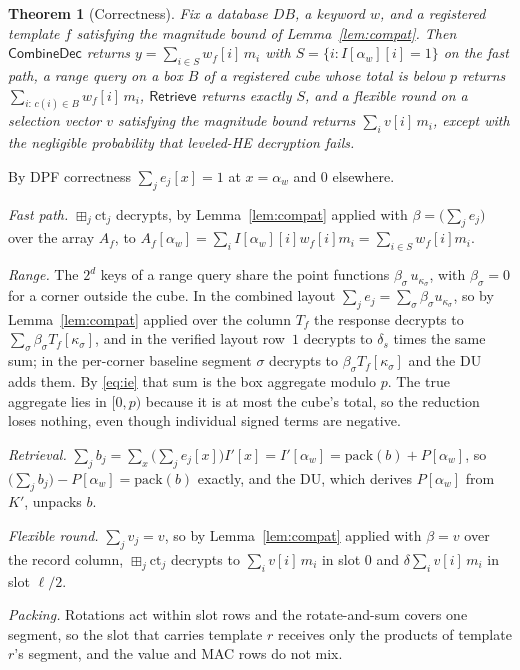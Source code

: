\documentclass[a4paper,fleqn]{cas-sc}
\newtheorem{theorem}{Theorem}
\newcommand{\bplus}{\boxplus}
\begin{document}
\begin{theorem}[Correctness]
\label{thm:correct}
Fix a database $DB$, a keyword $w$, and a registered template $f$ satisfying
the magnitude bound of Lemma~\ref{lem:compat}. Then $\mathsf{CombineDec}$
returns $y=\sum_{i\in S} w_f[i]\,m_i$ with $S=\{i: I[\alpha_w][i]=1\}$ on the
fast path, a range query on a box $B$ of a registered cube whose total is
below $p$ returns $\sum_{i:\,c(i)\in B}w_f[i]\,m_i$, $\mathsf{Retrieve}$
returns exactly $S$, and a flexible round on a selection vector $v$ satisfying
the magnitude bound returns $\sum_i v[i]\,m_i$, except with the negligible
probability that leveled-HE decryption fails.
\end{theorem}
\begin{pf}
By DPF correctness $\sum_j e_j[x]=1$ at $x=\alpha_w$ and $0$ elsewhere.

\emph{Fast path.} $\bplus_j\text{ct}_j$ decrypts, by Lemma~\ref{lem:compat}
applied with $\beta=\big(\sum_j e_j\big)$ over the array $A_f$, to
$A_f[\alpha_w]=\sum_i I[\alpha_w][i]w_f[i]m_i=\sum_{i\in S}w_f[i]m_i$.

\emph{Range.} The $2^d$ keys of a range query share the point functions
$\beta_\sigma\,u_{\kappa_\sigma}$, with $\beta_\sigma=0$ for a corner outside
the cube. In the combined layout $\sum_j e_j=\sum_\sigma\beta_\sigma
u_{\kappa_\sigma}$, so by Lemma~\ref{lem:compat} applied over the column $T_f$
the response decrypts to $\sum_\sigma\beta_\sigma T_f[\kappa_\sigma]$, and in
the verified layout row~$1$ decrypts to $\delta_s$ times the same sum; in the
per-corner baseline segment $\sigma$ decrypts to $\beta_\sigma
T_f[\kappa_\sigma]$ and the DU adds them. By \eqref{eq:ie} that sum is the box
aggregate modulo $p$. The true aggregate lies in $[0,p)$ because it is at most
the cube's total, so the reduction loses nothing, even though individual signed
terms are negative.

\emph{Retrieval.} $\sum_j b_j=\sum_x\big(\sum_j e_j[x]\big)
I'[x]=I'[\alpha_w]=\mathrm{pack}(b)+P[\alpha_w]$, so $\big(\sum_j
b_j\big)-P[\alpha_w]=\mathrm{pack}(b)$ exactly, and the DU, which derives
$P[\alpha_w]$ from $K'$, unpacks $b$.

\emph{Flexible round.} $\sum_j v_j=v$, so by Lemma~\ref{lem:compat} applied
with $\beta=v$ over the record column, $\bplus_j\text{ct}_j$ decrypts to
$\sum_i v[i]\,m_i$ in slot $0$ and $\delta\sum_i v[i]\,m_i$ in slot $\ell/2$.

\emph{Packing.} Rotations act within slot rows and the rotate-and-sum covers
one segment, so the slot that carries template $r$ receives only the products
of template $r$'s segment, and the value and MAC rows do not mix.


\end{pf}
\end{document}
